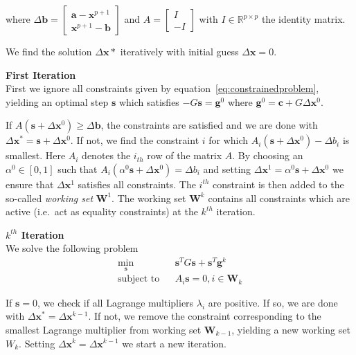 where $\Delta \mathbf{b} = \left[ \begin{array}{c}
\mathbf{a} - \mathbf{x}^{p+1} \\ \mathbf{x}^{p+1} - \mathbf{b}
\end{array}\right]$
and $A = \left[ \begin{array}{c} I \\ -I \end{array}\right]$ with
$I \in \mathbb{R}^{p \times p}$ the identity matrix.

We find the solution $\Delta \mathbf{x}\ast$ iteratively with initial guess
$\Delta \mathbf{x} = 0$.

{\bf First Iteration}\\
First we ignore all constraints given by equation~\ref{eq:constrainedproblem},
yielding an optimal step $\mathbf{s}$ which satisfies $-G\mathbf{s}
= \mathbf{g}^0$ where $\mathbf{g}^0 = \mathbf{c} + G \Delta \mathbf{x}^0$.

If $A(\mathbf{s} + \Delta \mathbf{x}^0) \geq \Delta \mathbf{b}$, the
constraints are satisfied and we are done with $\Delta \mathbf{x}^\ast
= \mathbf{s} + \Delta \mathbf{x}^0$. If not, we find the constraint $i$ for
which $A_i(\mathbf{s} + \Delta \mathbf{x}^0) - \Delta b_i$ is smallest. Here
$A_i$ denotes the $i_{th}$ row of the matrix $A$. By choosing an $\alpha^0 \in
[0,1]$ such that $A_i (\alpha^0 \mathbf{s} + \Delta \mathbf{x}^0 ) = \Delta
b_i$ and setting $\Delta \mathbf{x}^1 = \alpha^0 \mathbf{s}
+ \Delta \mathbf{x}^0$ we ensure that $\Delta \mathbf{x}^1$ satisfies all
constraints. The $i^{th}$ constraint is then added to the so-called {\it
working set} $\mathbf{W}^1$. The working set $\mathbf{W}^k$ contains all
constraints which are active (i.e.\ act as equality constraints) at the
$k^{th}$ iteration.

{\bf $k^{th}$ Iteration}\\
We solve the following problem
\begin{eqnarray}
\min_{\mathbf{s}} && \mathbf{s}^TG\mathbf{s} + \mathbf{s}^T \mathbf{g}^k \nonumber \\
\textrm{subject to} && A_i \mathbf{s}= 0, i \in \mathbf{W}_k
\end{eqnarray}

If $\mathbf{s} = 0$, we check if all Lagrange multipliers $\lambda_i$ are
positive. If so, we are done with $\Delta \mathbf{x}^\ast
= \Delta \mathbf{x}^{k-1}$. If not, we remove the constraint corresponding to
the smallest Lagrange multiplier from working set $\mathbf{W}_{k-1}$, yielding
a new working set $W_k$. Setting $\Delta \mathbf{x}^k
= \Delta \mathbf{x}^{k-1}$ we start a new iteration.

